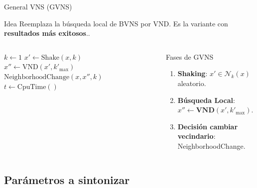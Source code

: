 \documentclass[aspectratio=169, 11pt, xcolor={dvipsnames,table}]{beamer}
\newcommand{\azul}[1]{\textcolor{UsachAzul}{#1}}
\newcommand{\naranja}[1]{\textcolor{UsachNaranja}{#1}}
\begin{document}
\begin{frame}{General VNS (GVNS)}
\begin{block}{Idea}
Reemplaza la búsqueda local de BVNS por \azul{VND}. Es la variante con
\textbf{resultados más exitosos}..
\end{block}

\vspace{-4pt}

\begin{columns}[T]
\scriptsize
\begin{algorithm}[H]
\caption{GVNS$(x, k'_{\max}, k_{\max}, t_{\max})$}
\begin{algorithmic}[1]
\Repeat
  \State $k \gets 1$
  \Repeat
    \State $x' \gets \text{Shake}(x, k)$
    \State $x'' \gets \text{VND}(x', k'_{\max})$
    \State $\text{NeighborhoodChange}(x, x'', k)$
  \State $t \gets \text{CpuTime}()$
\end{algorithmic}
\end{algorithm}

\center
\begin{alertblock}{Fases de GVNS}
\begin{enumerate}
  \item \textbf{Shaking}: $x' \in \mathcal{N}_k(x)$ aleatorio.
  \item \textbf{Búsqueda Local}: \naranja{$x'' \gets \textbf{VND}(x', k'_{\max})$}.
  \item \textbf{Decisión cambiar vecindario}: NeighborhoodChange.
\end{enumerate}
\end{alertblock}
\end{columns}
\end{frame}








\subsection{Parámetros a sintonizar}
\end{document}
